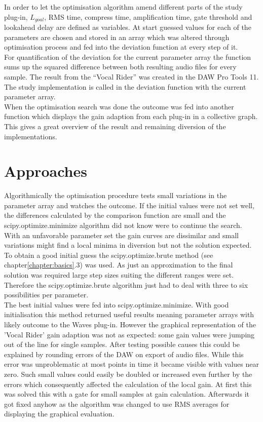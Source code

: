 In order to let the optimisation algorithm amend different parts of the study plug-in, $L_{goal}$, RMS time, compress time, amplification time, gate threshold and lookahead delay are defined as variables. At start guessed values for each of the parameters are chosen and stored in an array which was altered through optimisation process and fed into the deviation function at every step of it.\\
For quantification of the deviation for the current parameter array the function sums up the squared difference between both resulting audio files for every sample. The result from the “Vocal Rider” was created in the DAW Pro Tools 11. The study implementation is called in the deviation function with the current parameter array.\\
When the optimisation search was done the outcome was fed into another function which displays the gain adaption from each plug-in in a collective graph. This gives a great overview of the result and remaining diversion of the implementations.\\

\section{Approaches}

Algorithmically the optimisation procedure tests small variations in the parameter array and watches the outcome. If the initial values were not set well, the differences calculated by the comparison function are small and the scipy.optimize.minimize algorithm did not know were to continue the search. With an unfavorable parameter set the gain curves are dissimilar and small variations might find a local minima in diversion but not the solution expected.\\
To obtain a good initial guess the scipy.optimize.brute method (see chapter\ref{chapter:basics}.3) was used. As just an approximation to the final solution was required large step sizes suiting the different ranges were set. Therefore the scipy.optimize.brute algorithm just had to deal with three to six possibilities per parameter.\\
The best initial values were fed into scipy.optimize.minimize. With good initialisation this method returned useful results meaning parameter arrays with likely outcome to the Waves plug-in. However the graphical representation of the 'Vocal Rider' gain adaption was not as expected: some gain values were jumping out of the line for single samples. After testing possible causes this could be explained by rounding errors of the DAW on export of audio files. While this error was unproblematic at most points in time it became visible with values near zero. Such small values could easily be doubled or increased even further by the errors which consequently affected the calculation of the local gain. At first this was solved this with a gate for small samples at gain calculation. Afterwards it got fixed anyhow as the algorithm was changed to use RMS averages for displaying the graphical evaluation.\\

